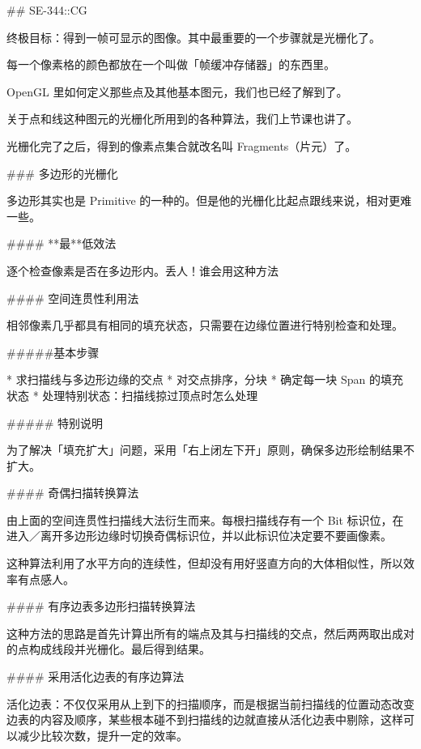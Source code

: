 \documentclass[
]{article}
\newenvironment{Shaded}{}{}
\newcommand{\FunctionTok}[1]{\textcolor[rgb]{0.02,0.16,0.49}{#1}}
\newcommand{\NormalTok}[1]{#1}
\newcommand{\StringTok}[1]{\textcolor[rgb]{0.25,0.44,0.63}{#1}}
\begin{document}
\begin{Shaded}
\begin{Highlighting}[]
\FunctionTok{## SE-344::CG}

\NormalTok{终极目标：得到一帧可显示的图像。其中最重要的一个步骤就是光栅化了。}

\NormalTok{每一个像素格的颜色都放在一个叫做「帧缓冲存储器」的东西里。}

\NormalTok{OpenGL 里如何定义那些点及其他基本图元，我们也已经了解到了。}

\NormalTok{关于点和线这种图元的光栅化所用到的各种算法，我们上节课也讲了。}

\NormalTok{光栅化完了之后，得到的像素点集合就改名叫 Fragments（片元）了。}

\FunctionTok{### 多边形的光栅化}

\NormalTok{多边形其实也是 Primitive 的一种的。但是他的光栅化比起点跟线来说，相对更难一些。}

\FunctionTok{#### **最**低效法}

\NormalTok{逐个检查像素是否在多边形内。丢人！谁会用这种方法}

\FunctionTok{#### 空间连贯性利用法}

\NormalTok{相邻像素几乎都具有相同的填充状态，只需要在边缘位置进行特别检查和处理。}

\NormalTok{#####基本步骤}

\NormalTok{* }\StringTok{求扫描线与多边形边缘的交点}
\StringTok{* 对交点排序，分块}
\StringTok{* 确定每一块 Span 的填充状态}
\StringTok{* 处理特别状态：扫描线掠过顶点时怎么处理}

\FunctionTok{##### 特别说明}

\NormalTok{为了解决「填充扩大」问题，采用「右上闭左下开」原则，确保多边形绘制结果不扩大。}

\FunctionTok{#### 奇偶扫描转换算法}

\NormalTok{由上面的空间连贯性扫描线大法衍生而来。每根扫描线存有一个 Bit 标识位，在进入／离开多边形边缘时切换奇偶标识位，并以此标识位决定要不要画像素。}

\NormalTok{这种算法利用了水平方向的连续性，但却没有用好竖直方向的大体相似性，所以效率有点感人。}

\FunctionTok{#### 有序边表多边形扫描转换算法}

\NormalTok{这种方法的思路是首先计算出所有的端点及其与扫描线的交点，然后两两取出成对的点构成线段并光栅化。最后得到结果。}

\FunctionTok{#### 采用活化边表的有序边算法}

\NormalTok{活化边表：不仅仅采用从上到下的扫描顺序，而是根据当前扫描线的位置动态改变边表的内容及顺序，某些根本碰不到扫描线的边就直接从活化边表中剔除，这样可以减少比较次数，提升一定的效率。}


\end{Highlighting}
\end{Shaded}
\end{document}

